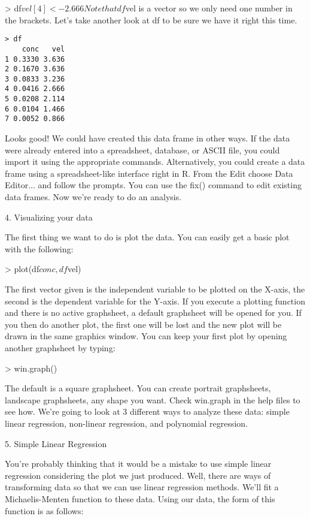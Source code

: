 {> df$vel[4] <- 2.666
Note that df$vel is a vector so we only need one number in the brackets. Let's take another look at df to be sure we have it right this time. 
\begin{framed}
\begin{verbatim}
> df
    conc   vel 
1 0.3330 3.636
2 0.1670 3.636
3 0.0833 3.236
4 0.0416 2.666
5 0.0208 2.114
6 0.0104 1.466
7 0.0052 0.866
\end{verbatim}
\end{framed}
Looks good! We could have created this data frame in other ways. If the data were already entered into a spreadsheet, database, or ASCII file, you could import it using the appropriate commands. Alternatively, you could create a data frame using a spreadsheet-like interface right in R. From the Edit choose Data Editor... and follow the prompts. You can use the fix() command to edit existing data frames. 
Now we're ready to do an analysis.

4. Visualizing your data


The first thing we want to do is plot the data. You can easily get a basic plot with the following:

> plot(df$conc, df$vel)

The first vector given is the independent variable to be plotted on the X-axis, the second is the dependent variable for the Y-axis. If you execute a plotting function and there is no active graphsheet, a default graphsheet will be opened for you. If you then do another plot, the first one will be lost and the new plot will be drawn in the 
same graphics window. You can keep your first plot by opening another graphsheet by typing: 

> win.graph()

The default is a square graphsheet. You can create portrait graphsheets, landscape graphsheets, any shape you want. Check win.graph in the help files to see how. 
We're going to look at 3 different ways to analyze these data: simple linear regression, non-linear regression, and polynomial regression. 

5. Simple Linear Regression


You're probably thinking that it would be a mistake to use simple linear regression considering the plot we just produced. Well, there are ways of transforming data so that we can use linear regression methods. We'll fit a Michaelis-Menten function to these data. Using our data, the form of this function is as follows: 

}
